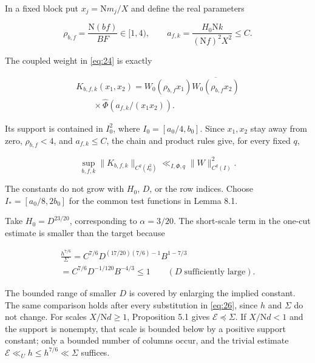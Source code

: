 \documentclass[reqno,a4paper,11pt]{amsart}
\begin{document}
In a fixed block put $x_j=\mathrm{N}m_j/X$ and define the real parameters

\begin{equation}\label{eq:kernel-scales}
\rho_{b,f}=\frac{\mathrm{N}(bf)}{BF}\in[1,4),\qquad a_{f,k}=\frac{H_0\mathrm{N}k}{(\mathrm{N}f)^2X^2}\le C.
\end{equation}

The coupled weight in \eqref{eq:24} is exactly

\begin{equation}\label{eq:actual-kernel}
\begin{gathered}
K_{b,f,k}(x_1,x_2)=W_0(\rho_{b,f}x_1)\overline{W_0(\rho_{b,f}x_2)} \\ \qquad\times\widehat{\Phi}(a_{f,k}/(x_1x_2)).
\end{gathered}
\end{equation}

Its support is contained in $I_0^2$, where $I_0=[a_0/4,b_0]$. Since $x_1,x_2$ stay away from zero, $\rho_{b,f}<4$, and $a_{f,k}\le C$, the chain and product rules give, for every fixed $q$,

\begin{equation}\label{eq:kernel-uniform}
\sup_{b,f,k}\|K_{b,f,k}\|_{C^q(I_0^2)}\ll_{I,\Phi,q}\|W\|_{C^q(I)}^2.
\end{equation}

The constants do not grow with $H_0$, $D$, or the row indices. Choose $I_*=[a_0/8,2b_0]$ for the common test functions in Lemma 8.1.

Take $H_0=D^{23/20}$, corresponding to $\alpha=3/20$. The short-scale term in the one-cut estimate is smaller than the target because

\begin{equation}\label{eq:27}
\begin{gathered}
\frac{h^{7/6}}{\Sigma}=C^{7/6}D^{(17/20)(7/6)-1}B^{1-7/3} \\ =C^{7/6}D^{-1/120}B^{-4/3}\le1\qquad(D\;\text{sufficiently large}).
\end{gathered}
\end{equation}

The bounded range of smaller $D$ is covered by enlarging the implied constant. The same comparison holds after every substitution in \eqref{eq:26}, since $h$ and $\Sigma$ do not change. For scales $X/\mathrm{N}d\ge1$, Proposition 5.1 gives $\mathcal{E}\preccurlyeq\Sigma$. If $X/\mathrm{N}d<1$ and the support is nonempty, that scale is bounded below by a positive support constant; only a bounded number of columns occur, and the trivial estimate $\mathcal{E}\ll_U h\le h^{7/6}\ll\Sigma$ suffices.
\end{document}
